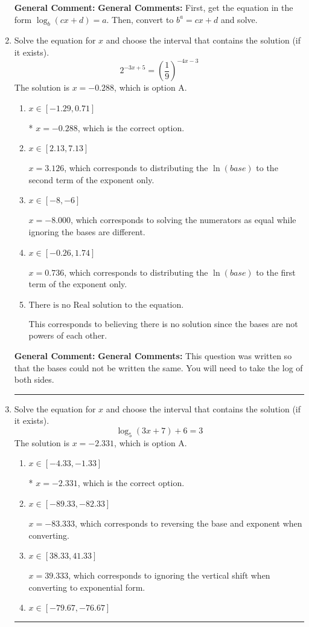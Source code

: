 \documentclass{extbook}[14pt]
\newcommand{\litem}[1]{\item #1

\rule{\textwidth}{0.4pt}}
\begin{document}
\begin{enumerate}
{\textbf{General Comment:} \textbf{General Comments:} First, get the equation in the form $\log_b{(cx+d)} = a$. Then, convert to $b^a = cx+d$ and solve.
}
\litem{
Solve the equation for $x$ and choose the interval that contains the solution (if it exists).
\[ 2^{-3x+5} = \left(\frac{1}{9}\right)^{-4x-3} \]The solution is \( x = -0.288 \), which is option A.\begin{enumerate}[label=\Alph*.]
\item \( x \in [-1.29, 0.71] \)

* $x = -0.288$, which is the correct option.
\item \( x \in [2.13, 7.13] \)

$x = 3.126$, which corresponds to distributing the $\ln(base)$ to the second term of the exponent only.
\item \( x \in [-8, -6] \)

$x = -8.000$, which corresponds to solving the numerators as equal while ignoring the bases are different.
\item \( x \in [-0.26, 1.74] \)

$x = 0.736$, which corresponds to distributing the $\ln(base)$ to the first term of the exponent only.
\item \( \text{There is no Real solution to the equation.} \)

This corresponds to believing there is no solution since the bases are not powers of each other.
\end{enumerate}

\textbf{General Comment:} \textbf{General Comments:} This question was written so that the bases could not be written the same. You will need to take the log of both sides.
}
\litem{
Solve the equation for $x$ and choose the interval that contains the solution (if it exists).
\[ \log_{5}{(3x+7)}+6 = 3 \]The solution is \( x = -2.331 \), which is option A.\begin{enumerate}[label=\Alph*.]
\item \( x \in [-4.33, -1.33] \)

* $x = -2.331$, which is the correct option.
\item \( x \in [-89.33, -82.33] \)

$x = -83.333$, which corresponds to reversing the base and exponent when converting.
\item \( x \in [38.33, 41.33] \)

$x = 39.333$, which corresponds to ignoring the vertical shift when converting to exponential form.
\item \( x \in [-79.67, -76.67] \)


\end{enumerate}}
\end{enumerate}
\end{document}

